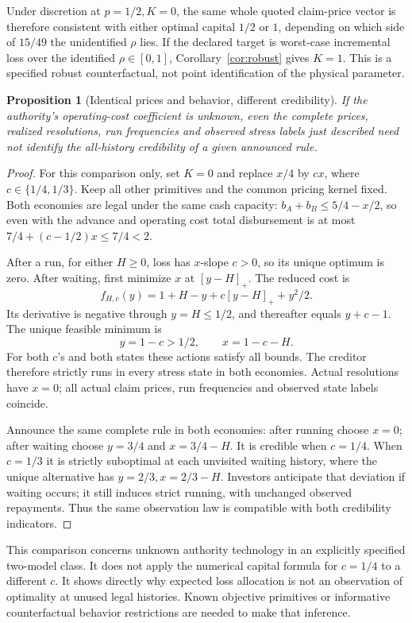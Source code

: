 \documentclass[11pt,a4paper]{article}
\numberwithin{equation}{section}
\newtheorem{proposition}[theorem]{Proposition}
\theoremstyle{definition}
\begin{document}
Under discretion at \(p=1/2,K=0\), the same whole quoted claim-price vector is therefore
consistent with either optimal capital \(1/2\) or \(1\), depending on
which side of \(15/49\) the unidentified \(\rho\) lies. If the declared
target is worst-case incremental loss over the identified
\(\rho\in[0,1]\), Corollary~\ref{cor:robust} gives \(K=1\). This is
a specified robust counterfactual, not point identification of the
physical parameter.

\begin{proposition}[Identical prices and behavior, different credibility]\label{prop:crednonid}
If the authority's operating-cost coefficient is unknown, even the
complete prices, realized resolutions, run frequencies and observed
stress labels just described need not identify the all-history
credibility of a given announced rule.
\end{proposition}
\begin{proof}
For this comparison only, set \(K=0\) and replace \(x/4\) by \(cx\),
where \(c\in\{1/4,1/3\}\). Keep all other primitives and the common
pricing kernel fixed. Both economies are legal under the same cash
capacity: \(b_A+b_B\le5/4-x/2\), so even with the advance and
operating cost total disbursement is at most
\(7/4+(c-1/2)x\le7/4<2\).

After a run, for either \(H\ge0\), loss has \(x\)-slope \(c>0\),
so its unique optimum is zero. After waiting, first minimize \(x\)
at \([y-H]_+\). The reduced cost is
\[
 f_{H,c}(y)=1+H-y+c[y-H]_++y^2/2.
\]
Its derivative is negative through \(y=H\le1/2\), and thereafter
equals \(y+c-1\). The unique feasible minimum is
\[
 y=1-c>1/2,\qquad x=1-c-H .
\]
For both \(c\)'s and both states these actions satisfy all bounds.
The creditor therefore strictly runs in every stress state in both
economies. Actual resolutions have \(x=0\); all actual claim prices,
run frequencies and observed state labels coincide.

Announce the same complete rule in both economies: after running
choose \(x=0\); after waiting choose \(y=3/4\) and \(x=3/4-H\).
It is credible when \(c=1/4\). When \(c=1/3\) it is strictly
suboptimal at each unvisited waiting history, where the unique
alternative has \(y=2/3,x=2/3-H\). Investors anticipate that
deviation if waiting occurs; it still induces strict running, with
unchanged observed repayments. Thus the same observation law is
compatible with both credibility indicators.
\end{proof}

This comparison concerns unknown authority technology in an explicitly
specified two-model class. It does not apply the numerical
capital formula for \(c=1/4\) to a different \(c\). It shows directly
why expected loss allocation is not an observation of optimality at
unused legal histories. Known objective primitives or informative
counterfactual behavior restrictions are needed to make that inference.
\end{document}
